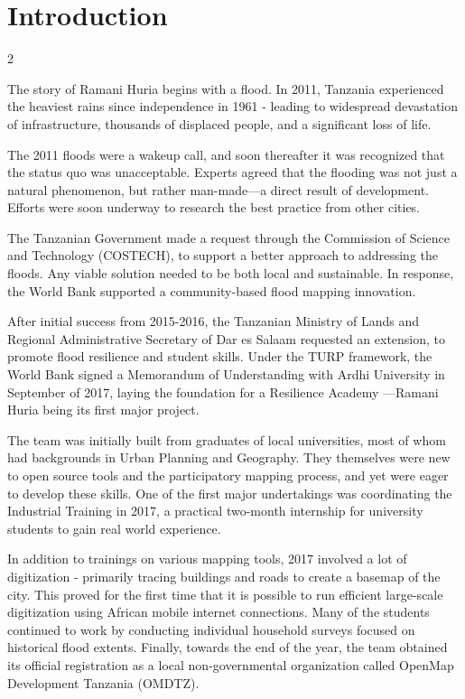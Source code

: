 \documentclass[a4paper,12pt,twoside]{article}
\begin{document}
\section{Introduction}
\label{Introduction}
\begin{multicols} {2}

The story of Ramani Huria begins with a flood. In 2011, Tanzania experienced the heaviest rains since independence in 1961 - leading to widespread devastation of infrastructure, thousands of displaced people, and a significant loss of life. 

The 2011 floods were a wakeup call, and soon thereafter it was recognized that the status quo was unacceptable. Experts agreed that the flooding was not just a natural phenomenon, but rather man-made—a direct result of development. Efforts were soon underway to research the best practice from other cities. 

The Tanzanian Government made a request through the Commission of Science and Technology (COSTECH), to support a better approach to addressing the floods. Any viable solution needed to be both local and sustainable. In response, the World Bank supported a community-based flood mapping innovation.

After initial success from 2015-2016, the Tanzanian Ministry of Lands and Regional Administrative Secretary of Dar es Salaam requested an extension, to promote flood resilience and student skills. Under the TURP framework, the World Bank signed a Memorandum of Understanding with Ardhi University in September of 2017, laying the foundation for a Resilience Academy —Ramani Huria being its first major project.

The team was initially built from graduates of local universities, most of whom had backgrounds in Urban Planning and Geography. They themselves were new to open source tools and the participatory mapping process, and yet were eager to develop these skills. One of the first major undertakings was coordinating the Industrial Training in 2017, a practical two-month internship for university students to gain real world experience. 

In addition to trainings on various mapping tools, 2017  involved a lot of digitization - primarily tracing buildings and roads to create a basemap of the city. This proved for the first time  that it is possible to run efficient large-scale digitization using African mobile internet connections. Many of the students continued to work by conducting individual household surveys focused on historical flood extents. Finally, towards the end of the year, the team obtained its official registration as a local non-governmental organization called OpenMap Development Tanzania (OMDTZ). 


\end{multicols}
\end{document}
